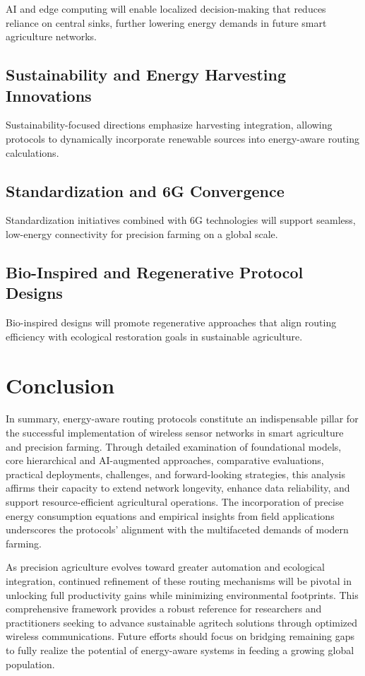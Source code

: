 \documentclass[12pt]{article}
\begin{document}
AI and edge computing will enable localized decision-making that reduces reliance on central sinks, further lowering energy demands in future smart agriculture networks.

\subsection{Sustainability and Energy Harvesting Innovations}

Sustainability-focused directions emphasize harvesting integration, allowing protocols to dynamically incorporate renewable sources into energy-aware routing calculations.

\subsection{Standardization and 6G Convergence}

Standardization initiatives combined with 6G technologies will support seamless, low-energy connectivity for precision farming on a global scale.

\subsection{Bio-Inspired and Regenerative Protocol Designs}

Bio-inspired designs will promote regenerative approaches that align routing efficiency with ecological restoration goals in sustainable agriculture.

\section{Conclusion}

In summary, energy-aware routing protocols constitute an indispensable pillar for the successful implementation of wireless sensor networks in smart agriculture and precision farming. Through detailed examination of foundational models, core hierarchical and AI-augmented approaches, comparative evaluations, practical deployments, challenges, and forward-looking strategies, this analysis affirms their capacity to extend network longevity, enhance data reliability, and support resource-efficient agricultural operations. The incorporation of precise energy consumption equations and empirical insights from field applications underscores the protocols' alignment with the multifaceted demands of modern farming.

As precision agriculture evolves toward greater automation and ecological integration, continued refinement of these routing mechanisms will be pivotal in unlocking full productivity gains while minimizing environmental footprints. This comprehensive framework provides a robust reference for researchers and practitioners seeking to advance sustainable agritech solutions through optimized wireless communications. Future efforts should focus on bridging remaining gaps to fully realize the potential of energy-aware systems in feeding a growing global population.

	
	
	
\end{document}
